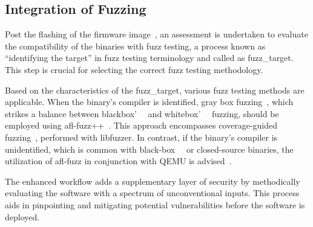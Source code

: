 \subsection*{Integration of Fuzzing}

Post the flashing of the firmware image~\cite{Firmware14:online}, an assessment
is undertaken to evaluate the compatibility of the binaries with fuzz testing, a process known as
``identifying the target'' in fuzz testing terminology and called as \gls{fuzz_target}.
This step is crucial for selecting the correct fuzz testing methodology.

Based on the characteristics of the \gls{fuzz_target}, various fuzz testing
methods are applicable. When the binary's compiler is identified, gray box
fuzzing~\cite{jamil2016software}, which strikes a balance between
blackbox'~\cite{godefroid2007random}~\cite{jamil2016software} and
whitebox'~\cite{godefroid2007random}~\cite{jamil2016software} fuzzing, should be
employed using afl-fuzz++~\cite{257204}. This approach encompasses
coverage-guided fuzzing~\cite{abran2001guide}, performed with
libfuzzer\cite{libFuzze17:online}. In contrast, if the binary's compiler is
unidentified, which is common with
black-box~\cite{jamil2016software}~\cite{pudas2017improving} or closed-source
binaries, the utilization of afl-fuzz in conjunction with QEMU is
advised~\cite{AFLplusp57:online}.

The enhanced workflow adds a supplementary layer of security
by methodically evaluating the software with a spectrum of unconventional
inputs. This process aids in pinpointing and mitigating potential
vulnerabilities before the software is deployed.

